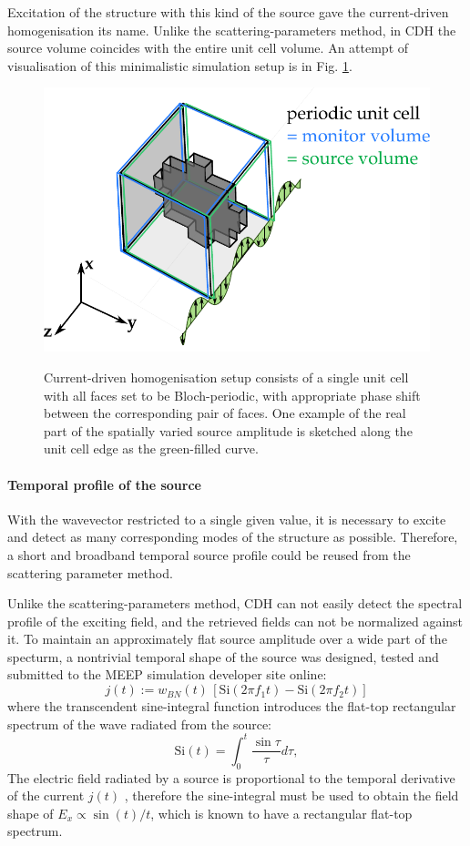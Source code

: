 Excitation of the structure with this kind of the source gave the current-driven homogenisation its name. Unlike the scattering-parameters method, in CDH the source volume coincides with the entire unit cell volume. An attempt of visualisation of this minimalistic simulation setup is in Fig. \ref{fg_fdtd_cdh}. 
\begin{figure}[h] \centering \caption{Current-driven homogenisation setup consists of a single unit cell with all faces set to be Bloch-periodic, with appropriate phase shift between the corresponding pair of faces. One example of the real part of the spatially varied source amplitude is sketched along the unit cell edge as the green-filled curve.} \includegraphics[width=.5\textwidth]{img/cdh_geometry.pdf}  \label{fg_fdtd_cdh} \end{figure} %
\paragraph{Temporal profile of the source}%
With the wavevector restricted to a single given value, it is necessary to excite and detect as many corresponding modes of the structure as possible. Therefore, a short and broadband temporal source profile could be reused from the scattering parameter method. 

Unlike the scattering-parameters method, CDH can not easily detect the spectral profile of the exciting field, and the retrieved fields can not be normalized against it. To maintain an approximately flat source amplitude over a wide part of the specturm, a nontrivial temporal shape of the source was designed, tested and submitted to the MEEP simulation developer site \cite{} online:
\begin{equation} 
	j(t) := w_{BN}(t)\, \left[\mathrm{Si}(2\pi f_1 t) - \mathrm{Si}(2\pi f_2 t) \right]
\label{eq_}\end{equation}
where the transcendent sine-integral function introduces the flat-top rectangular spectrum of the wave radiated from the source:
\begin{equation} \mathrm{Si}(t) = \int_0^t \frac{\sin \tau}{\tau} d\tau, \label{eq_Si}\end{equation}
	The electric field radiated by a source is proportional to the temporal derivative of the current $j(t)$ \cite{ab-initio}, therefore the sine-integral must be used to obtain the field shape of $E_x\propto \sin(t)/t$, which is known to have a rectangular flat-top spectrum.

